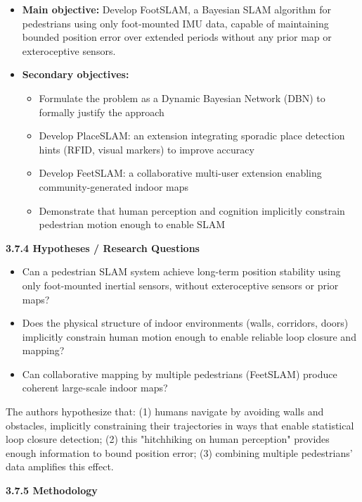 \documentclass{ipgpmaster}
\begin{document}
\begin{itemize}
    \item \textbf{Main objective:} Develop FootSLAM, a Bayesian SLAM algorithm for pedestrians using only foot-mounted IMU data, capable of maintaining bounded position error over extended periods without any prior map or exteroceptive sensors.
    \item \textbf{Secondary objectives:} 
    \begin{itemize}
        \item Formulate the problem as a Dynamic Bayesian Network (DBN) to formally justify the approach
        \item Develop PlaceSLAM: an extension integrating sporadic place detection hints (RFID, visual markers) to improve accuracy
        \item Develop FeetSLAM: a collaborative multi-user extension enabling community-generated indoor maps
        \item Demonstrate that human perception and cognition implicitly constrain pedestrian motion enough to enable SLAM


    \end{itemize}
\end{itemize}
\textbf{3.7.4 Hypotheses / Research Questions}

\begin{itemize}
    \item Can a pedestrian SLAM system achieve long-term position stability using only foot-mounted inertial sensors, without exteroceptive sensors or prior maps?
    \item Does the physical structure of indoor environments (walls, corridors, doors) implicitly constrain human motion enough to enable reliable loop closure and mapping?
    \item Can collaborative mapping by multiple pedestrians (FeetSLAM) produce coherent large-scale indoor maps?
\end{itemize}
The authors hypothesize that: (1) humans navigate by avoiding walls and obstacles, implicitly constraining their trajectories in ways that enable statistical loop closure detection; (2) this "hitchhiking on human perception" provides enough information to bound position error; (3) combining multiple pedestrians' data amplifies this effect.

\textbf{3.7.5    Methodology}
\end{document}
